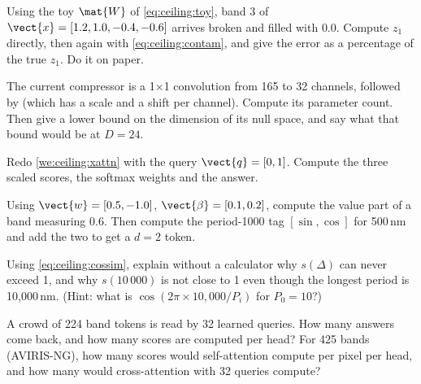 \begin{confusions}
\end{confusions}

\begin{checkyourself}
\item\label{ex:ceiling:1} Using the toy $\mat{W}$ of \cref{eq:ceiling:toy}, band 3 of $\vect{x} = [1.2, 1.0, -0.4, -0.6]$ arrives broken and filled with $0.0$. Compute $z_1$ directly, then again with \cref{eq:ceiling:contam}, and give the error as a percentage of the true $z_1$. Do it on paper.
\item\label{ex:ceiling:2} The current compressor is a 1$\times$1 convolution from 165 to 32 channels, followed by  (which has a scale and a shift per channel). Compute its parameter count. Then give a lower bound on the dimension of its null space, and say what that bound would be at $D = 24$.
\item\label{ex:ceiling:3} Redo \cref{we:ceiling:xattn} with the query $\vect{q} = [0, 1]$. Compute the three scaled scores, the softmax weights and the answer.
\item\label{ex:ceiling:4} Using $\vect{w} = [0.5, -1.0]$, $\vect{\beta} = [0.1, 0.2]$, compute the value part of a band measuring $0.6$. Then compute the period-1000 tag $[\sin, \cos]$ for 500\,nm and add the two to get a $d = 2$ token.
\item\label{ex:ceiling:5} Using \cref{eq:ceiling:cossim}, explain without a calculator why $s(\Delta)$ can never exceed 1, and why $s(10\,000)$ is not close to 1 even though the longest period is 10,000\,nm. (Hint: what is $\cos(2\pi\times10{,}000/P_i)$ for $P_0 = 10$?)
\item\label{ex:ceiling:6} A crowd of 224 band tokens is read by 32 learned queries. How many answers come back, and how many scores are computed per head? For 425 bands (AVIRIS-NG), how many scores would self-attention compute per pixel per head, and how many would cross-attention with 32 queries compute?
\end{checkyourself}

